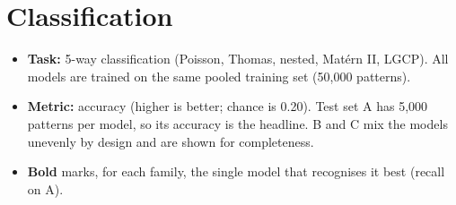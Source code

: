 \documentclass[10pt,a4paper]{article}
\begin{document}
\section{Classification}

\begin{itemize}
  \item \textbf{Task:} 5-way classification (Poisson, Thomas, nested, Mat\'ern II, LGCP). All models are trained on the same pooled training set (50{,}000 patterns).
  \item \textbf{Metric:} accuracy (higher is better; chance is 0.20). Test set A has 5{,}000 patterns per model, so its accuracy is the headline. B and C mix the models unevenly by design and are shown for completeness.
  \item \textbf{Bold} marks, for each family, the single model that recognises it best (recall on A).
\end{itemize}
\end{document}
